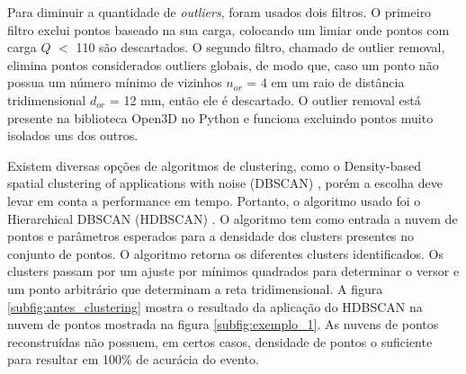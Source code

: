 \documentclass[a4paper,12pt,oneside]{book}
\begin{document}
\par Para diminuir a quantidade de \textit{outliers}, foram usados dois filtros. O primeiro filtro exclui pontos baseado na sua carga, colocando um limiar onde pontos com carga $Q$ $<$ 110 são descartados. O segundo filtro, chamado de outlier removal, elimina pontos considerados outliers globais, de modo que, caso um ponto não possua um número mínimo de vizinhos $n_{or}$ = 4 em um raio de distância tridimensional $d_{or}$ = 12 mm, então ele é descartado. O outlier removal está presente na biblioteca Open3D \cite{open3d} no Python e funciona excluindo pontos muito isolados uns dos outros.

\par Existem diversas opções de algoritmos de clustering, como o Density-based spatial clustering of applications with noise (DBSCAN) \cite{dbscan}, porém a escolha deve levar em conta a performance em tempo. Portanto, o algoritmo usado foi o Hierarchical DBSCAN (HDBSCAN) \cite{hdbscan1, hdbscan2}. O algoritmo tem como entrada a nuvem de pontos e parâmetros esperados para a densidade dos clusters presentes no conjunto de pontos. O algoritmo retorna os diferentes clusters identificados. Os clusters passam por um ajuste por mínimos quadrados para determinar o versor e um ponto arbitrário que determinam a reta tridimensional. A figura \ref{subfig:antes_clustering} mostra o resultado da aplicação do HDBSCAN na nuvem de pontos mostrada na figura \ref{subfig:exemplo_1}. As nuvens de pontos reconstruídas não possuem, em certos casos, densidade de pontos o suficiente para resultar em 100\% de acurácia do evento.
\end{document}
